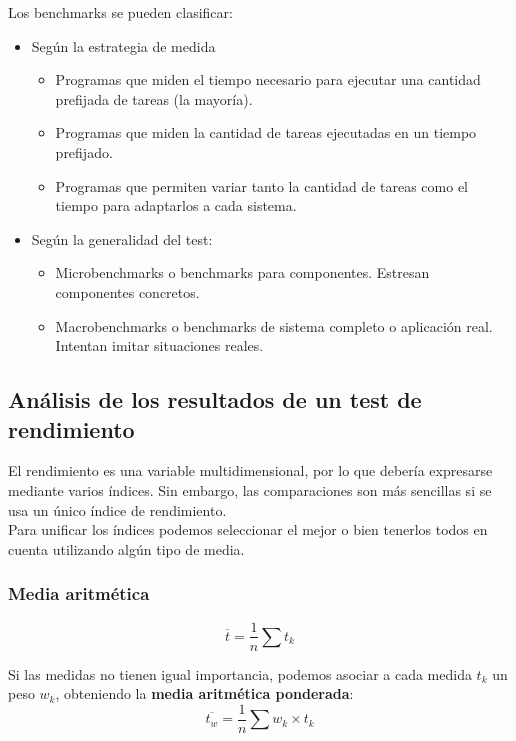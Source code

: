 \documentclass[12pt,spanish]{article}
\begin{document}
Los benchmarks se pueden clasificar:
\begin{itemize}
	\item Según la estrategia de medida
	\begin{itemize}
		\item Programas que miden el tiempo necesario para ejecutar una cantidad prefijada de tareas (la mayoría).
		\item Programas que miden la cantidad de tareas ejecutadas en un tiempo prefijado.
		\item Programas que permiten variar tanto la cantidad de tareas como el tiempo para adaptarlos a cada sistema.
	\end{itemize}
	\item Según la generalidad del test:
		\begin{itemize}
			\item Microbenchmarks o benchmarks para componentes. Estresan componentes concretos.
			\item Macrobenchmarks o benchmarks de sistema completo o aplicación real. Intentan imitar situaciones reales.
		\end{itemize}
\end{itemize}

\subsection{Análisis de los resultados de un test de rendimiento}

El rendimiento es una variable multidimensional, por lo que debería expresarse mediante varios índices. Sin embargo, las comparaciones son más sencillas si se usa un único índice de rendimiento.\\

Para unificar los índices podemos seleccionar el mejor o bien tenerlos todos en cuenta utilizando algún tipo de media.

\subsubsection{Media aritmética}

\begin{equation*}
	\overline{t}=\frac{1}{n}\sum{t_k}
\end{equation*}

Si las medidas no tienen igual importancia, podemos asociar a cada medida $t_k$ un peso $w_k$, obteniendo la \textbf{media aritmética ponderada}:
\begin{equation*}
	\overline{t_w}=\frac{1}{n}\sum{w_k \times t_k}
\end{equation*}
\end{document}
